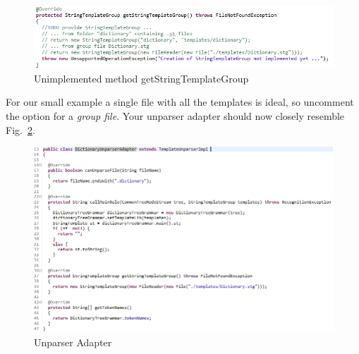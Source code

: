 \begin{enumerate}
\begin{figure}[!htbp]
\begin{center}
 \includegraphics[width=\textwidth]{pics/moca/5MocaTreeToText/UnparserAdapterNotImplemented}
  \caption{Unimplemented method getStringTemplateGroup} 
  \label{fig:moca-UnparserAdapterNotImplemented}
\end{center}
\end{figure} 

For our small example a single file with all the templates is ideal, so uncomment the option for a \emph{group file}.
Your unparser adapter should now closely resemble Fig.~\ref{fig:moca-DictionaryUnparserAdapter}.  
 
\begin{figure}[!htbp]
\begin{center}
 \includegraphics[width=\textwidth]{pics/moca/5MocaTreeToText/UnparserAdapter}
  \caption{Unparser Adapter} 
  \label{fig:moca-DictionaryUnparserAdapter}
\end{center}
\end{figure} 


\end{enumerate}
